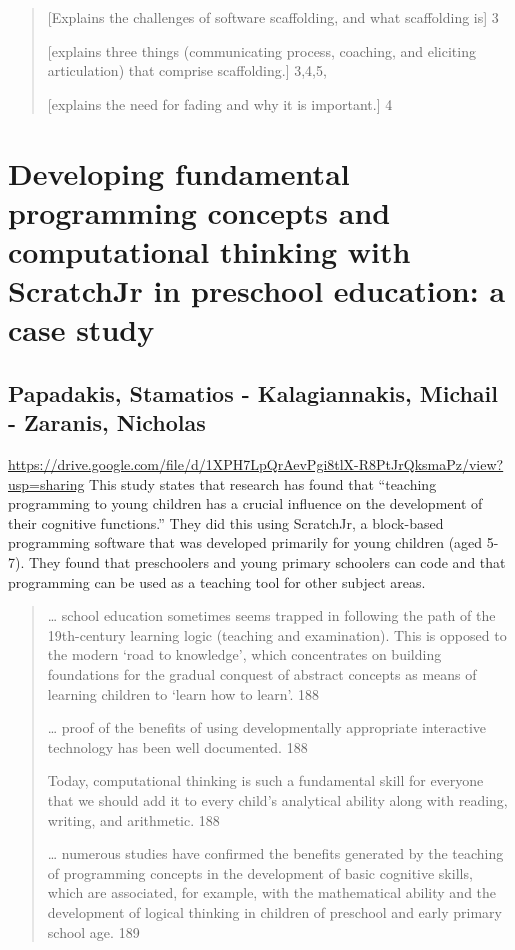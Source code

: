 \documentclass[12pt]{extarticle}
\begin{document}
{\begin{quote}
[Explains the challenges of software scaffolding, and what scaffolding is] 	3

[explains three things (communicating process, coaching, and eliciting articulation) that comprise scaffolding.] 	3,4,5,

[explains the need for fading and why it is important.] 4
\end{quote}

\section*{Developing fundamental programming concepts and computational thinking with ScratchJr in preschool education: a case study}
\subsection*{Papadakis, Stamatios - Kalagiannakis, Michail - Zaranis, Nicholas}
\url{https://drive.google.com/file/d/1XPH7LpQrAevPgi8tlX-R8PtJrQksmaPz/view?usp=sharing}  
This study states that research has found that “teaching programming to young children has a crucial influence on the development of their cognitive functions.” They did this using ScratchJr, a block-based programming software that was developed primarily for young children (aged 5-7). They found that preschoolers and young primary schoolers can code and that programming can be used as a teaching tool for other subject areas.
\begin{quote}
    
    … school education sometimes seems trapped in following the path of the 19th-century learning logic (teaching and examination).  This is opposed to the modern ‘road to knowledge’, which concentrates on building foundations for the gradual conquest of abstract concepts as means of learning children to ‘learn how to learn’.	188
    
    … proof of the benefits of using developmentally appropriate interactive technology has been well documented.	188
    
    Today, computational thinking is such a fundamental skill for everyone that we should add it to every child’s analytical ability along with reading, writing, and arithmetic. 	188
    
    … numerous studies have confirmed the benefits generated by the teaching of programming concepts in the development of basic cognitive skills, which are associated, for example, with the mathematical ability and the development of logical thinking in children of preschool and early primary school age. 	189
    

\end{quote}}
\end{document}
